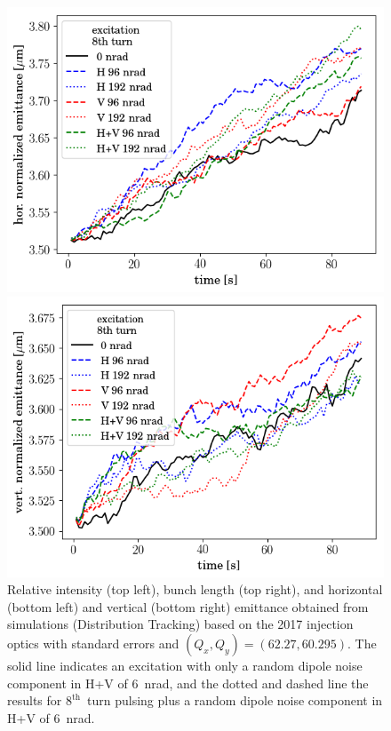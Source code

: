\documentclass[%
 reprint,
 amsmath,amssymb,
 aps,
prstab,
]{revtex4-1}
\begin{document}
\begin{figure}[b]
\begin{minipage}[t]{0.49\linewidth}
		\centering
		\includegraphics[width=1.0\linewidth]{2017injerra2b2uran1_2e-3_8th_3_5um_emit1.png}
	\end{minipage}	
	\begin{minipage}[t]{0.49\linewidth}
		\centering
		\includegraphics[width=1.0\linewidth]{2017injerra2b2uran1_2e-3_8th_3_5um_emit2.png}
	\end{minipage}	
	\caption{\label{fig:8thsim} Relative intensity (top left), bunch length (top right), and horizontal (bottom left) and vertical (bottom right) emittance obtained from simulations (Distribution Tracking) based on the 2017 injection optics with standard errors and $(Q_x,Q_y)=(62.27,60.295)$. The solid line indicates an excitation with only a random dipole noise component in H+V of 6~nrad, and the dotted and dashed line the results for $8^{\mathrm{th}}$~turn pulsing plus a random dipole noise component in H+V of 6~nrad.}
\end{figure}
\end{document}
